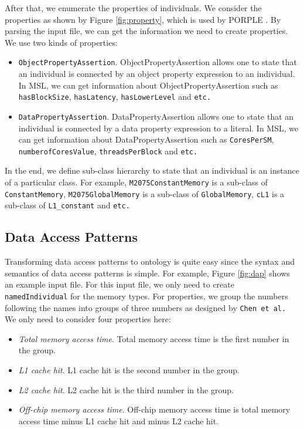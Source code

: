 \documentclass{sig-alternate}
\begin{document}
After that, we enumerate the properties of individuals. We consider the properties as shown by Figure \ref{fig:property}, which is used by PORPLE \cite{porple}. By parsing the input file, we can get the information we need to create properties. We use two kinds of properties:

\begin{itemize}
	\item \texttt{ObjectPropertyAssertion}. ObjectPropertyAssertion allows one to state that an individual is connected by an object property expression to an individual. In MSL, we can get information about ObjectPropertyAssertion such as \texttt{hasBlockSize}, \texttt{hasLatency}, \texttt{hasLowerLevel} and \texttt{etc.}
	\item \texttt{DataPropertyAssertion}. DataPropertyAssertion allows one to state that an individual is connected by a data property expression to a literal. In MSL, we can get information about DataPropertyAssertion such as \texttt{CoresPerSM}, \texttt{numberofCoresValue}, \texttt{threadsPerBlock} and \texttt{etc.}
\end{itemize}

In the end, we define sub-class hierarchy to state that an individual is an instance of a particular class. For example, \texttt{M2075ConstantMemory} is a sub-class of \texttt{ConstantMemory}, \texttt{M2075GlobalMemory} is a sub-class of \texttt{GlobalMemory}, \texttt{cL1} is a sub-class of \texttt{L1\_constant} and \texttt{etc.} 

\subsection{Data Access Patterns}
Transforming data access patterns to ontology is quite easy since the syntax and semantics of data access patterns is simple. For example, Figure \ref{fig:dap} shows an example input file. For this input file, we only need to create \texttt{namedIndividual} for the memory types. For properties, we group the numbers following the names into groups of three numbers as designed by \texttt{Chen et al.} \cite{porple} We only need to consider four properties here:

\begin{itemize}
	\item \textit{Total memory access time}. Total memory access time is the first number in the group.
	\item \textit{L1 cache hit}. L1 cache hit is the second number in the group.
	\item \textit{L2 cache hit}. L2 cache hit is the third number in the group.
	\item \textit{Off-chip memory access time}. Off-chip memory access time is total memory access time minus L1 cache hit and minus L2 cache hit.
\end{itemize}
\end{document}
